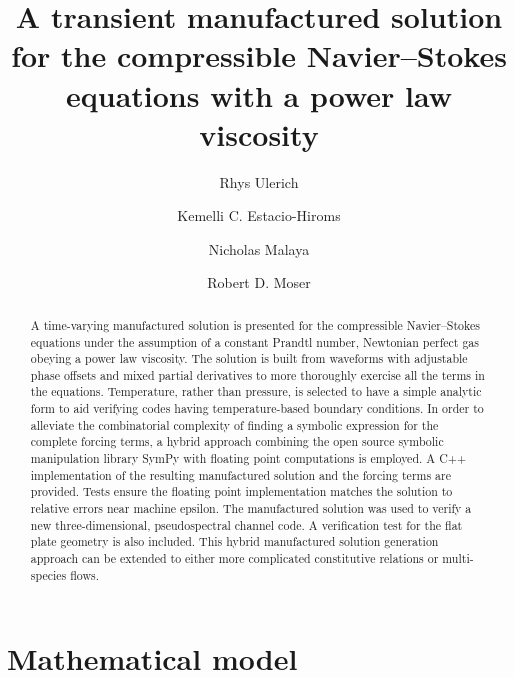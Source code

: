 \documentclass[10pt,reqno]{amsart}
\begin{document}
\title{
    A transient manufactured solution for the compressible Navier--Stokes
    equations with a power law viscosity
}
\author{Rhys Ulerich
        \and Kemelli C. Estacio-Hiroms
        \and Nicholas Malaya
        \and Robert D. Moser}

\begin{abstract}
A time-varying manufactured solution is presented for the compressible
Navier--Stokes equations under the assumption of a constant Prandtl number,
Newtonian perfect gas obeying a power law viscosity.  The solution is built
from waveforms with adjustable phase offsets and mixed partial derivatives to
more thoroughly exercise all the terms in the equations.  Temperature, rather
than pressure, is selected to have a simple analytic form to aid verifying
codes having temperature-based boundary conditions.  In order to alleviate the
combinatorial complexity of finding a symbolic expression for the complete
forcing terms, a hybrid approach combining the open source symbolic
manipulation library SymPy with floating point computations is employed.  A C++
implementation of the resulting manufactured solution and the forcing terms are
provided.  Tests ensure the floating point implementation matches the solution
to relative errors near machine epsilon.  The manufactured solution was used to
verify a new three-dimensional, pseudospectral channel code.  A verification
test for the flat plate geometry is also included.  This hybrid manufactured
solution generation approach can be extended to either more complicated
constitutive relations or multi-species flows.
\end{abstract}

\maketitle

\section{Mathematical model}
\end{document}
